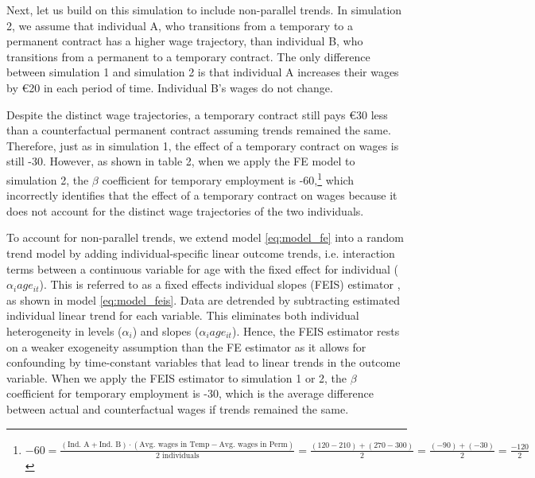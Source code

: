 Next, let us build on this simulation to include non-parallel trends.  In simulation 2, we assume that individual A, who transitions from a temporary to a permanent contract has a higher wage trajectory, than individual B, who transitions from a permanent to a temporary contract.  The only difference between simulation 1 and simulation 2 is that individual A increases their wages by €20 in each period of time.  Individual B's wages do not change.

Despite the distinct wage trajectories, a temporary contract still pays €30 less than a counterfactual permanent contract assuming trends remained the same.  Therefore, just as in simulation 1, the effect of a temporary contract on wages is still -30.  However, as shown in table 2, when we apply the FE model to simulation 2, the $\beta$  coefficient for temporary employment is -60,\footnote{$-60 = \frac{(\text{Ind. A} + \text{Ind. B}) \cdot (\text{Avg. wages in Temp} - \text{Avg. wages in Perm})}{2 \text{ individuals}} = \frac{(120-210) + (270-300)}{2} = \frac{(-90) + (-30)}{2} = \frac{-120}{2}$} which incorrectly identifies that the effect of a temporary contract on wages because it does not account for the distinct wage trajectories of the two individuals.  

To account for non-parallel trends, we extend model \ref{eq:model_fe} into a random trend model by adding individual-specific linear outcome trends, i.e. interaction terms between a continuous variable for age with the fixed effect for individual ($\alpha_i age_{it}$).  This is referred to as a fixed effects individual slopes (FEIS) estimator  \citep{ludwig_is_2018}, as shown in model \ref{eq:model_feis}.  Data are detrended by subtracting estimated individual linear trend for each variable. This eliminates both individual heterogeneity in levels ($\alpha_i$) and slopes ($\alpha_i age_{it}$). Hence, the FEIS estimator rests on a weaker exogeneity assumption than the FE estimator as it allows for confounding by time-constant variables that lead to linear trends in the outcome variable. When we apply the FEIS estimator to simulation 1 or 2, the $\beta$ coefficient for temporary employment is -30, which is the average difference between actual and counterfactual wages if trends remained the same. 


